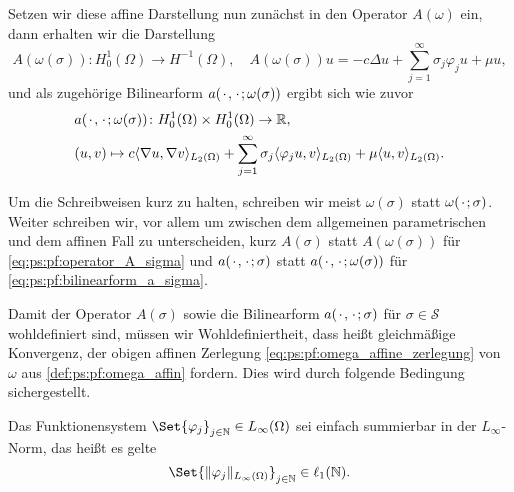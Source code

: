 Setzen wir diese affine Darstellung nun zunächst in den Operator $A(\omega)$ ein, dann erhalten wir die Darstellung
\begin{equation}
\label{eq:ps:pf:operator_A_sigma}
    A(\omega(\sigma)) \colon H^{1}_{0}(\Omega) \to H^{-1}(\Omega), \quad A(\omega(\sigma)) u = -c \Delta u + \sum_{j = 1}^{\infty} \sigma_{j} \varphi_{j} u + \mu u,
\end{equation}
und als zugehörige Bilinearform $a({\mkern2mu\cdot\mkern2mu}, {\mkern2mu\cdot\mkern2mu}; \omega(\sigma))$ ergibt sich wie zuvor
\begin{equation}
\label{eq:ps:pf:bilinearform_a_sigma}
    \begin{aligned}
    &a({\mkern2mu\cdot\mkern2mu}, {\mkern2mu\cdot\mkern2mu}; \omega(\sigma)) \colon H^{1}_{0}(\Omega) \times H^{1}_{0}(\Omega) \to \mathbb{R}, \\
    &(u, v) \mapsto c\langle\nabla u,\nabla v\rangle_{L_{2}(\Omega)} + \sum_{j = 1}^{\infty} \sigma_{j} \langle\varphi_{j} u,v\rangle_{L_{2}(\Omega)} + \mu \langle u,v\rangle_{L_{2}(\Omega)}.
    \end{aligned}
\end{equation}

\begin{Bemerkung}
    Um die Schreibweisen kurz zu halten, schreiben wir meist $\omega(\sigma)$ statt $\omega({\mkern2mu\cdot\mkern2mu}; \sigma)$.
    Weiter schreiben wir, vor allem um zwischen dem allgemeinen parametrischen und dem affinen Fall zu unterscheiden, kurz $A(\sigma)$ statt $A(\omega(\sigma))$ für \cref{eq:ps:pf:operator_A_sigma} und $a({\mkern2mu\cdot\mkern2mu}, {\mkern2mu\cdot\mkern2mu}; \sigma)$ statt $a({\mkern2mu\cdot\mkern2mu}, {\mkern2mu\cdot\mkern2mu}; \omega(\sigma))$ für \cref{eq:ps:pf:bilinearform_a_sigma}.
\end{Bemerkung}

Damit der Operator $A(\sigma)$ sowie die Bilinearform $a({\mkern2mu\cdot\mkern2mu}, {\mkern2mu\cdot\mkern2mu}; \sigma)$ für $\sigma \in \mathcal S$ wohldefiniert sind, müssen wir Wohldefiniertheit, dass heißt gleichmäßige Konvergenz, der obigen affinen Zerlegung \cref{eq:ps:pf:omega_affine_zerlegung} von $\omega$ aus \cref{def:ps:pf:omega_affin} fordern.
Dies wird durch folgende Bedingung sichergestellt.
\begin{Annahme}
    Das Funktionensystem $\Set{ \varphi_{j} }_{j \in \mathbb{N}} \in L_{\infty}(\Omega)$ sei einfach summierbar in der $L_{\infty}$-Norm, das heißt es gelte
    \begin{equation}
        \Set{ \norm{\varphi_{j}}_{L_{\infty}(\Omega) } }_{j \in \mathbb{N}} \in \ell_{1}(\mathbb{N}).
    \end{equation}
\end{Annahme}

